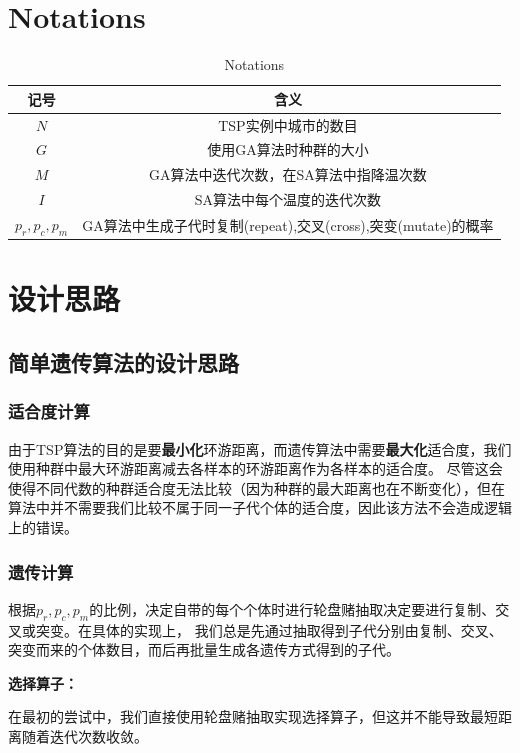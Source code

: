 \documentclass[12pt]{article}
\begin{document}
\section{Notations}
\begin{table}[H]
  \centering
  \begin{tabular}{cc}
    \hline
    记号 & 含义 \\ \hline
    $N$ & TSP实例中城市的数目 \\
    $G$ &  使用GA算法时种群的大小\\
    $M$ & GA算法中迭代次数，在SA算法中指降温次数\\
    $I$ & SA算法中每个温度的迭代次数\\
    $p_r,p_c,p_m$ & GA算法中生成子代时复制(repeat),交叉(cross),突变(mutate)的概率\\
    \hline
  \end{tabular}
  \caption{Notations}
  \label{tab: Notations}
\end{table}

\section{设计思路}
\subsection{简单遗传算法的设计思路}
\subsubsection{适合度计算}
由于TSP算法的目的是要\textbf{最小化}环游距离，而遗传算法中需要\textbf{最大化}适合度，我们使用种群中最大环游距离减去各样本的环游距离作为各样本的适合度。
尽管这会使得不同代数的种群适合度无法比较（因为种群的最大距离也在不断变化），但在算法中并不需要我们比较不属于同一子代个体的适合度，因此该方法不会造成逻辑上的错误。

\subsubsection{遗传计算}
根据$p_r,p_c,p_m$的比例，决定自带的每个个体时进行轮盘赌抽取决定要进行复制、交叉或突变。在具体的实现上，
我们总是先通过抽取得到子代分别由复制、交叉、突变而来的个体数目，而后再批量生成各遗传方式得到的子代。

\textbf{选择算子：}

在最初的尝试中，我们直接使用轮盘赌抽取实现选择算子，但这并不能导致最短距离随着迭代次数收敛。
\end{document}
